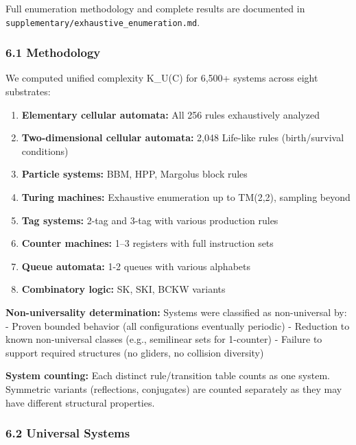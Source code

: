\documentclass[
  11pt,
]{article}
\providecommand{\tightlist}{%
  \setlength{\itemsep}{0pt}\setlength{\parskip}{0pt}}
\begin{document}
Full enumeration methodology and complete results are documented in
\texttt{supplementary/exhaustive\_enumeration.md}.

\hypertarget{methodology}{%
\subsubsection{6.1 Methodology}\label{methodology}}

We computed unified complexity K\_U(C) for 6,500+ systems across eight
substrates:

\begin{enumerate}
\def\labelenumi{\arabic{enumi}.}
\tightlist
\item
  \textbf{Elementary cellular automata:} All 256 rules exhaustively
  analyzed
\item
  \textbf{Two-dimensional cellular automata:} 2,048 Life-like rules
  (birth/survival conditions)
\item
  \textbf{Particle systems:} BBM, HPP, Margolus block rules
\item
  \textbf{Turing machines:} Exhaustive enumeration up to TM(2,2),
  sampling beyond
\item
  \textbf{Tag systems:} 2-tag and 3-tag with various production rules
\item
  \textbf{Counter machines:} 1--3 registers with full instruction sets
\item
  \textbf{Queue automata:} 1-2 queues with various alphabets
\item
  \textbf{Combinatory logic:} SK, SKI, BCKW variants
\end{enumerate}

\textbf{Non-universality determination:} Systems were classified as
non-universal by: - Proven bounded behavior (all configurations
eventually periodic) - Reduction to known non-universal classes (e.g.,
semilinear sets for 1-counter) - Failure to support required structures
(no gliders, no collision diversity)

\textbf{System counting:} Each distinct rule/transition table counts as
one system. Symmetric variants (reflections, conjugates) are counted
separately as they may have different structural properties.

\hypertarget{universal-systems}{%
\subsubsection{6.2 Universal Systems}\label{universal-systems}}
\end{document}

